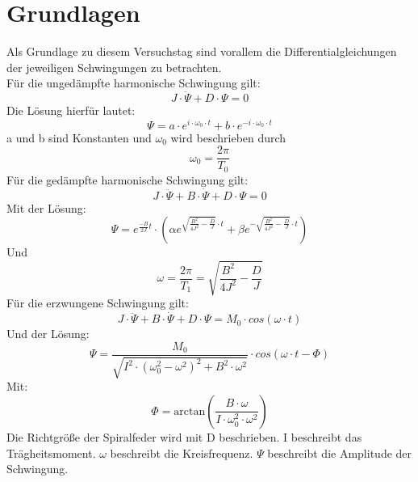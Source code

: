 \documentclass[12pt,a4paper,]{scrreprt}
\begin{document}
        \section{Grundlagen}
			Als Grundlage zu diesem Versuchstag sind vorallem die Differentialgleichungen der jeweiligen Schwingungen zu betrachten. \\
			Für die ungedämpfte harmonische Schwingung gilt:\\
			\begin{equation}
				J \cdot \ddot \Psi + D \cdot \Psi = 0
			\end{equation}
			Die Lösung hierfür lautet:\\
			\begin{equation}
				\Psi = a \cdot e^{i \cdot \omega_0 \cdot t} + b \cdot e^{-i \cdot \omega_0 \cdot t}
			\end{equation}
			a und b sind Konstanten und $\omega_0$ wird beschrieben durch
			\begin{equation}
				\omega_0=\frac{2\pi}{T_0}
			\end{equation}
			Für die gedämpfte harmonische Schwingung gilt:\\
			\begin{equation}
				J \cdot \ddot \Psi + B \cdot \dot \Psi + D \cdot \Psi = 0
			\end{equation}
			Mit der Lösung:\\
			\begin{equation}
				\Psi = e^{\frac{-B}{2J}t}\cdot (\alpha e^{ \sqrt{\frac{B^2}{4J^2}-\frac{D}{J}}\cdot t}+\beta e^{ -  \sqrt{\frac{B^2}{4J^2}-\frac{D}{J}}\cdot t})
			\end{equation}
			Und 
			\begin{equation}
				\omega=\frac{2\pi}{T_1}=\sqrt{\frac{B^2}{4J^2} - \frac{D}{J}}
			\end{equation}
			Für die erzwungene  Schwingung gilt:\\
			\begin{equation}
				J \cdot \ddot \Psi + B \cdot \dot \Psi + D \cdot \Psi = M_0 \cdot cos(\omega \cdot t)
			\end{equation}
			Und der Lösung:\\
			\begin{equation}
				\Psi =\frac{M_0}{\sqrt{I^2 \cdot (\omega_0^2- \omega^2)^2+B^2 \cdot \omega^2}} \cdot cos(\omega \cdot t-\Phi)
			\end{equation}
			Mit:\\
            \begin{equation}
				\Phi = \text{arctan}(\frac{B \cdot \omega}{I \cdot \omega_0^2 \cdot \omega^2})
			\end{equation}
Die Richtgröße der Spiralfeder wird mit D beschrieben. I beschreibt das Trägheitsmoment. $\omega$ beschreibt die Kreisfrequenz. $\Psi$ beschreibt die Amplitude der Schwingung.
\end{document}
